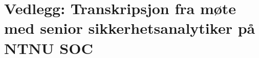 \chapter{Vedlegg: Transkripsjon fra møte med senior sikkerhetsanalytiker på NTNU SOC}
\label{transkripsjon}
